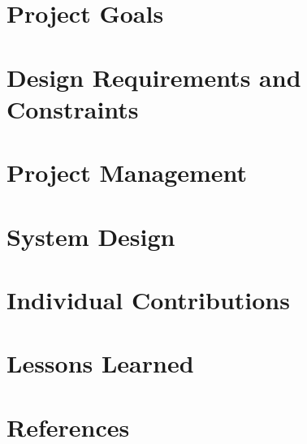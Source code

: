 \documentclass[10pt]{article}
\begin{document}


    \tableofcontents
    \newpage

    \section{Project Goals}
    

    \section{Design Requirements and Constraints}
    

    \section{Project Management}
    

    \section{System Design}
    

    \section{Individual Contributions}
    

    \section{Lessons Learned}
    

    \section{References}
    
\end{document}
